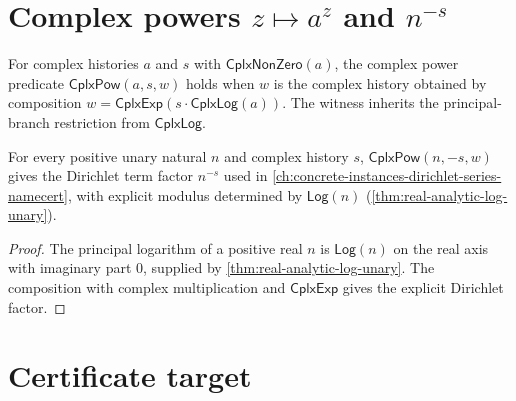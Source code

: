 \section{Complex powers \(z \mapsto a^z\) and \(n^{-s}\)}
\label{sec:cplx-analytic-powers}

\begin{definition}
\label{def:cplx-power}
For complex histories \(a\) and \(s\) with \(\mathsf{CplxNonZero}(a)\), the complex power predicate \(\mathsf{CplxPow}(a, s, w)\) holds when \(w\) is the complex history obtained by composition \(w = \mathsf{CplxExp}(s \cdot \mathsf{CplxLog}(a))\). The witness inherits the principal-branch restriction from \(\mathsf{CplxLog}\).
\end{definition}


\begin{theorem}
\label{thm:cplx-pow-dirichlet}
For every positive unary natural \(n\) and complex history \(s\), \(\mathsf{CplxPow}(n, -s, w)\) gives the Dirichlet term factor \(n^{-s}\) used in \autoref{ch:concrete-instances-dirichlet-series-namecert}, with explicit modulus determined by \(\mathsf{Log}(n)\) (\autoref{thm:real-analytic-log-unary}).
\end{theorem}
\begin{proof}
The principal logarithm of a positive real \(n\) is \(\mathsf{Log}(n)\) on the real axis with imaginary part \(0\), supplied by \autoref{thm:real-analytic-log-unary}. The composition with complex multiplication and \(\mathsf{CplxExp}\) gives the explicit Dirichlet factor.
\end{proof}


\section{Certificate target}
\label{sec:cplx-analytic-cert-target}

